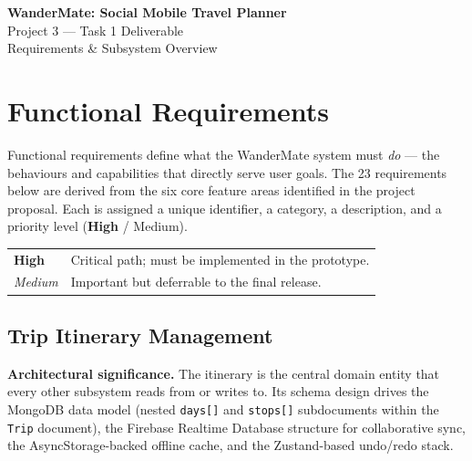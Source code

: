 \documentclass[12pt, a4paper]{article}
\newcommand{\high}{\textbf{High}}
\newcommand{\medium}{Medium}
\begin{document}
\thispagestyle{empty}

\vspace*{2.5cm}

\begin{center}
  {\LARGE\bfseries WanderMate: Social Mobile Travel Planner}\\[0.8em]
  {\large Project 3 --- Task 1 Deliverable}\\[0.4em]
  {\large Requirements \& Subsystem Overview}
\end{center}

\tableofcontents
\newpage

\section{Functional Requirements}

Functional requirements define what the WanderMate system must \emph{do} --- the behaviours and capabilities that directly serve user goals. The 23 requirements below are derived from the six core feature areas identified in the project proposal. Each is assigned a unique identifier, a category, a description, and a priority level (\high{} / \medium).

\vspace{0.6em}
\noindent
\begin{tabular}{ll}
  \textbf{High}   & Critical path; must be implemented in the prototype. \\
  \textit{Medium} & Important but deferrable to the final release.        \\
\end{tabular}

\subsection{Trip Itinerary Management}

\begin{tcolorbox}[notebox]
  \textbf{Architectural significance.} The itinerary is the central domain entity that every other subsystem reads from or writes to. Its schema design drives the MongoDB data model (nested \texttt{days[]} and \texttt{stops[]} subdocuments within the \texttt{Trip} document), the Firebase Realtime Database structure for collaborative sync, the AsyncStorage-backed offline cache, and the Zustand-based undo/redo stack.
\end{tcolorbox}
\end{document}
